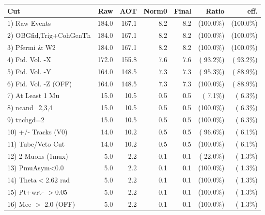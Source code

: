  \begin{table}[h!]\centering
 \begin{tabular}{||l||r|r|r|r|r|r||}
 \hline
 \hline
 Cut & Raw & AOT & Norm0 & Final & Ratio & eff.       \\
 \hline
  1) Raw Events           &        184.0 &        167.1 &          8.2 &          8.2 & (100.0\%) & (100.0\%) \\
  2) OBGfid,Trig+CohGenTh &        184.0 &        167.1 &          8.2 &          8.2 & (100.0\%) & (100.0\%) \\
  3) Pfermi \& W2         &        184.0 &        167.1 &          8.2 &          8.2 & (100.0\%) & (100.0\%) \\
  4) Fid. Vol. -X         &        172.0 &        155.8 &          7.6 &          7.6 & ( 93.2\%) & ( 93.2\%) \\
  5) Fid. Vol. -Y         &        164.0 &        148.5 &          7.3 &          7.3 & ( 95.3\%) & ( 88.9\%) \\
  6) Fid. Vol. -Z (OFF)   &        164.0 &        148.5 &          7.3 &          7.3 & (100.0\%) & ( 88.9\%) \\
  7) At Least 1 Mu        &         15.0 &         10.5 &          0.5 &          0.5 & (  7.1\%) & (  6.3\%) \\
  8) ncand=2,3,4          &         15.0 &         10.5 &          0.5 &          0.5 & (100.0\%) & (  6.3\%) \\
  9) tnchgd=2             &         15.0 &         10.5 &          0.5 &          0.5 & (100.0\%) & (  6.3\%) \\
 10) +/- Tracks (V0)      &         14.0 &         10.2 &          0.5 &          0.5 & ( 96.6\%) & (  6.1\%) \\
 11) Tube/Veto Cut        &         14.0 &         10.2 &          0.5 &          0.5 & (100.0\%) & (  6.1\%) \\
 12) 2 Muons (1mux)       &          5.0 &          2.2 &          0.1 &          0.1 & ( 22.0\%) & (  1.3\%) \\
 13) PmuAsym<0.0          &          5.0 &          2.2 &          0.1 &          0.1 & (100.0\%) & (  1.3\%) \\
 14) Theta$<$2.62 rad     &          5.0 &          2.2 &          0.1 &          0.1 & (100.0\%) & (  1.3\%) \\
 15) Pt+wrt- $>$0.05      &          5.0 &          2.2 &          0.1 &          0.1 & (100.0\%) & (  1.3\%) \\
 16) Mee $>$ 2.0  (OFF)   &          5.0 &          2.2 &          0.1 &          0.1 & (100.0\%) & (  1.3\%) \\

\end{tabular}
\end{table}
